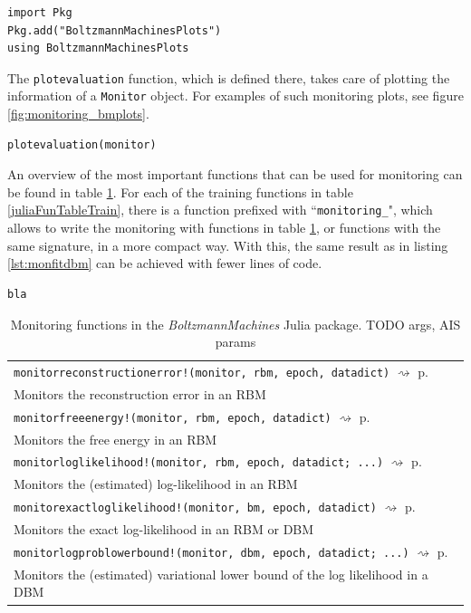 \documentclass[12pt]{article}
\newcommand{\inlinecode}[1]{\texttt{#1}}
\newcommand{\apkg}[1]{\emph{#1}}
\newcommand{\rightpageref}[1]{\hfill $\rightsquigarrow$ p.\ \pageref{#1}}
\begin{document}
\begin{lstlisting}
import Pkg
Pkg.add("BoltzmannMachinesPlots")
using BoltzmannMachinesPlots
\end{lstlisting}

The \inlinecode{plotevaluation} function, which is defined there, takes care of plotting the information of a \inlinecode{Monitor} object.
For examples of such monitoring plots, see figure \ref{fig:monitoring_bmplots}.
\begin{lstlisting}
plotevaluation(monitor)
\end{lstlisting}

An overview of the most important functions that can be used for monitoring can be found in table \ref{monfun}.
For each of the training functions in table \ref{juliaFunTableTrain}, there is a function prefixed with ``\inlinecode{monitoring\_}", which allows to write the monitoring with functions in table \ref{monfun}, or functions with the same signature, in a more compact way.
With this, the same result as in listing \ref{lst:monfitdbm} can be achieved with fewer lines of code.
\begin{lstlisting}
bla
\end{lstlisting}

\begin{table}[h]
   \begin{tabularx}{\textwidth}{X}
   \hline
   \inlinecode{monitorreconstructionerror!(monitor, rbm, epoch, datadict)} \rightpageref{bms_monitorreconstructionerror!}\\
     Monitors the reconstruction error in an RBM \\
     \inlinecode{monitorfreeenergy!(monitor, rbm, epoch, datadict)} \rightpageref{bms_monitorfreeenergy!}\\ 
Monitors the free energy in an RBM \\
     \inlinecode{monitorloglikelihood!(monitor, rbm, epoch, datadict; ...)} \rightpageref{bms_monitorloglikelihood!}\\ 
Monitors the (estimated) log-likelihood in an RBM \\
        \inlinecode{monitorexactloglikelihood!(monitor, bm, epoch, datadict)} \rightpageref{bms_monitorexactloglikelihood!}\\ 
Monitors the exact log-likelihood in an RBM or DBM \\
     \inlinecode{monitorlogproblowerbound!(monitor, dbm, epoch, datadict; ...)} \rightpageref{bms_monitorlogproblowerbound!}\\
  Monitors the (estimated) variational lower bound of the log likelihood in a DBM \\
   \hline
\end{tabularx}
\caption{Monitoring functions in the \apkg{BoltzmannMachines} Julia package. TODO args,  AIS params}
\label{monfun}
\end{table}
\end{document}

